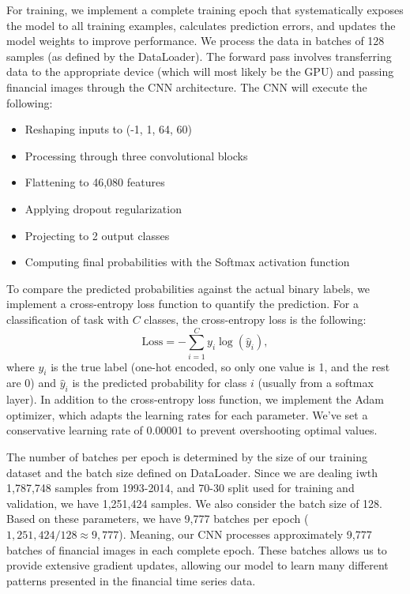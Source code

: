 \documentclass[12pt]{article}
\begin{document}
For training, we implement a complete training epoch that systematically exposes the model to all training examples, calculates prediction errors, and updates the model weights to improve performance. We process the data in batches of 128 samples (as defined by the DataLoader). The forward pass involves transferring data to the appropriate device (which will most likely be the GPU) and passing financial images through the CNN architecture. The CNN will execute the following:

\begin{itemize}
	\item Reshaping inputs to (-1, 1, 64, 60)
	\item Processing through three convolutional blocks
	\item Flattening to 46,080 features
	\item Applying dropout regularization
	\item Projecting to 2 output classes
	\item Computing final probabilities with the Softmax activation function
\end{itemize}
To compare the predicted probabilities against the actual binary labels, we implement a cross-entropy loss function to quantify the prediction. For a classification of task with $C$ classes, the cross-entropy loss is the following:
\begin{equation}
	\text{Loss}=-\sum_{i=1}^{C}y_i\log\left(\hat{y}_i\right),
\end{equation}
where $y_i$ is the true label (one-hot encoded, so only one value is 1, and the rest are 0) and $\hat{y}_i$ is the predicted probability for class $i$ (usually from a softmax layer). In addition to the cross-entropy loss function, we implement the Adam optimizer, which adapts the learning rates for each parameter. We've set a conservative learning rate of 0.00001 to prevent overshooting optimal values.

The number of batches per epoch is determined by the size of our training dataset and the batch size defined on DataLoader. Since we are dealing iwth 1,787,748 samples from 1993-2014, and 70-30 split used for training and validation, we have 1,251,424 samples. We also consider the batch size of 128. Based on these parameters, we have 9,777 batches per epoch ($1,251,424 / 128 \approx 9,777$). Meaning, our CNN processes approximately 9,777 batches of financial images in each complete epoch. These batches allows us to provide extensive gradient updates, allowing our model to learn many different patterns presented in the financial time series data.
\end{document}
